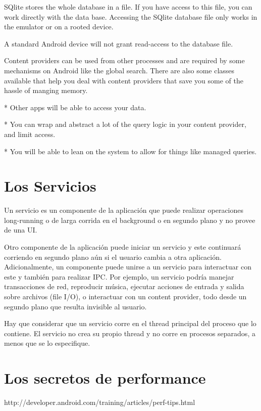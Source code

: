 SQlite stores the whole database in a file. If you have access to this file, you can work directly with the data base. Accessing the SQlite database file only works in the emulator or on a rooted device.

A standard Android device will not grant read-access to the database file.

Content providers can be used from other processes and are required by some mechanisms on Android like the global search. There are also some classes available that help you deal with content providers that save you some of the hassle of manging memory.

   * Other apps will be able to access your data.

   * You can wrap and abstract a lot of the query logic in your content provider, and limit access.

   * You will be able to lean on the system to allow for things like managed queries.

\section{Los Servicios}
\label{sec:services}

Un servicio es un componente de la aplicaci\'on que puede realizar operaciones long-running o de larga corrida en el background o en segundo plano y no provee de una \ac{UI}.

Otro componente de la aplicaci\'on puede iniciar un servicio y este continuar\'a corriendo en segundo plano a\'un si el usuario cambia a otra aplicaci\'on. Adicionalmente, un componente puede unirse a un servicio para interactuar con este y tambi\'en para realizar \ac{IPC}. Por ejemplo, un servicio podr\'ia manejar transacciones de red, reproducir m\'usica, ejecutar acciones de entrada y salida sobre archivos (file I/O), o interactuar con un content provider, todo desde un segundo plano que resulta invisible al usuario.

Hay que considerar que un servicio corre en el thread principal del proceso que lo contiene. El servicio no crea su propio thread y no corre en procesos separados, a menos que se lo especifique.

\section{Los secretos de performance}
\label{sec:performance.secrets}

http://developer.android.com/training/articles/perf-tips.html

